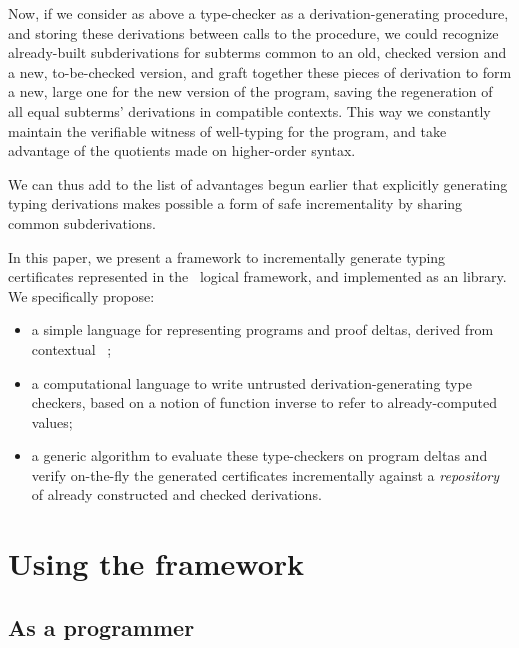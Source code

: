 \documentclass{llncs}
\begin{document}
Now, if we consider as above a type-checker as a derivation-generating
procedure, and storing these derivations between calls to the
procedure, we could recognize already-built subderivations for
subterms common to an old, checked version and a new, to-be-checked
version, and graft together these pieces of derivation to form a new,
large one for the new version of the program, saving the regeneration
of all equal subterms' derivations in compatible contexts. This way we
constantly maintain the verifiable witness of well-typing for the
program, and take advantage of the quotients made on higher-order
syntax.

We can thus add to the list of advantages begun earlier that
explicitly generating typing derivations makes possible a form of safe
incrementality by sharing common subderivations.

In this paper, we present a framework to incrementally generate typing
certificates represented in the \LF\ logical framework, and implemented
as an  library. We specifically propose:
\begin{itemize}
\item a simple language for representing programs and proof
  deltas, derived from contextual \LF\ \cite{nanevski2008contextual};
\item a computational language to write untrusted
  derivation-generating type checkers, based on a notion of function
  inverse %
  to refer to already-computed values;
\item a generic algorithm to evaluate these type-checkers on program
  deltas and verify on-the-fly the generated certificates
  incrementally against a \emph{repository} of already constructed and
  checked derivations.
\end{itemize}

\section{Using the framework}

\subsection{As a programmer}
\label{sec:use-incremental}

\end{document}

